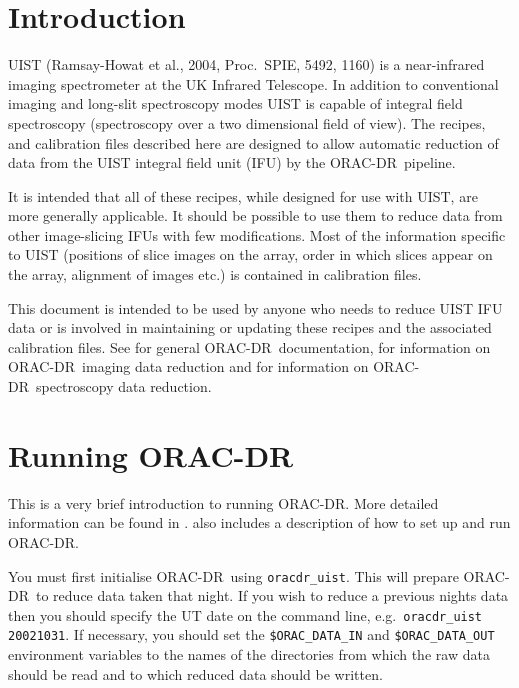 \documentclass[twoside,11pt,nolof]{starlink}
\providecommand{\ORACDR}{{\footnotesize ORAC-DR}}
\begin{document}
\scfrontmatter

\section{Introduction}

UIST (Ramsay-Howat et al., 2004, Proc.\ SPIE, 5492, 1160)
is a near-infrared imaging spectrometer at the UK Infrared
Telescope. In addition to conventional imaging and long-slit
spectroscopy modes UIST is capable of integral field spectroscopy
(spectroscopy over a two dimensional field of view). The recipes,
and calibration files described here are designed to allow
automatic reduction of data from the UIST integral field unit (IFU) by
the \ORACDR\ pipeline.

It is intended that all of these recipes, while designed for use with
UIST, are more generally applicable. It should be possible to use them
to reduce data from other image-slicing IFUs with few
modifications. Most of the information specific to UIST (positions of
slice images on the array, order in which slices appear on the array,
alignment of images etc.) is contained in calibration files.

This document is intended to be used by anyone who needs to reduce
UIST IFU data or is involved in maintaining or updating these recipes
and the associated calibration files. See  for
general \ORACDR\ documentation,  for
information on \ORACDR\ imaging data reduction and
 for information on \ORACDR\ spectroscopy data
reduction.

\section{Running ORAC-DR}

This is a very brief introduction to running \ORACDR. More detailed
information can be found in .
 also includes a description of how to set up
and run \ORACDR.

You must first initialise \ORACDR\ using \texttt{oracdr\_uist}. This will
prepare \ORACDR\ to reduce data taken that night. If
you wish to reduce a previous nights data then you should specify the
UT date on the command line, e.g.\ \texttt{oracdr\_uist 20021031}. If
necessary, you should set the \texttt{\$ORAC\_DATA\_IN} and \texttt{\$ORAC\_DATA\_OUT} environment variables to the names of the
directories from which the raw data should be read and to which reduced
data should be written.
\end{document}

